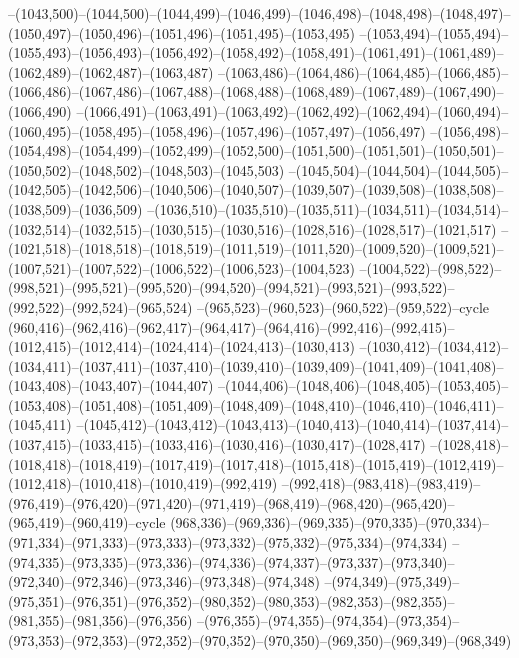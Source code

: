 --(1043,500)--(1044,500)--(1044,499)--(1046,499)--(1046,498)--(1048,498)--(1048,497)--(1050,497)--(1050,496)--(1051,496)--(1051,495)--(1053,495)
--(1053,494)--(1055,494)--(1055,493)--(1056,493)--(1056,492)--(1058,492)--(1058,491)--(1061,491)--(1061,489)--(1062,489)--(1062,487)--(1063,487)
--(1063,486)--(1064,486)--(1064,485)--(1066,485)--(1066,486)--(1067,486)--(1067,488)--(1068,488)--(1068,489)--(1067,489)--(1067,490)--(1066,490)
--(1066,491)--(1063,491)--(1063,492)--(1062,492)--(1062,494)--(1060,494)--(1060,495)--(1058,495)--(1058,496)--(1057,496)--(1057,497)--(1056,497)
--(1056,498)--(1054,498)--(1054,499)--(1052,499)--(1052,500)--(1051,500)--(1051,501)--(1050,501)--(1050,502)--(1048,502)--(1048,503)--(1045,503)
--(1045,504)--(1044,504)--(1044,505)--(1042,505)--(1042,506)--(1040,506)--(1040,507)--(1039,507)--(1039,508)--(1038,508)--(1038,509)--(1036,509)
--(1036,510)--(1035,510)--(1035,511)--(1034,511)--(1034,514)--(1032,514)--(1032,515)--(1030,515)--(1030,516)--(1028,516)--(1028,517)--(1021,517)
--(1021,518)--(1018,518)--(1018,519)--(1011,519)--(1011,520)--(1009,520)--(1009,521)--(1007,521)--(1007,522)--(1006,522)--(1006,523)--(1004,523)
--(1004,522)--(998,522)--(998,521)--(995,521)--(995,520)--(994,520)--(994,521)--(993,521)--(993,522)--(992,522)--(992,524)--(965,524)
--(965,523)--(960,523)--(960,522)--(959,522)--cycle
(960,416)--(962,416)--(962,417)--(964,417)--(964,416)--(992,416)--(992,415)--(1012,415)--(1012,414)--(1024,414)--(1024,413)--(1030,413)
--(1030,412)--(1034,412)--(1034,411)--(1037,411)--(1037,410)--(1039,410)--(1039,409)--(1041,409)--(1041,408)--(1043,408)--(1043,407)--(1044,407)
--(1044,406)--(1048,406)--(1048,405)--(1053,405)--(1053,408)--(1051,408)--(1051,409)--(1048,409)--(1048,410)--(1046,410)--(1046,411)--(1045,411)
--(1045,412)--(1043,412)--(1043,413)--(1040,413)--(1040,414)--(1037,414)--(1037,415)--(1033,415)--(1033,416)--(1030,416)--(1030,417)--(1028,417)
--(1028,418)--(1018,418)--(1018,419)--(1017,419)--(1017,418)--(1015,418)--(1015,419)--(1012,419)--(1012,418)--(1010,418)--(1010,419)--(992,419)
--(992,418)--(983,418)--(983,419)--(976,419)--(976,420)--(971,420)--(971,419)--(968,419)--(968,420)--(965,420)--(965,419)--(960,419)--cycle
(968,336)--(969,336)--(969,335)--(970,335)--(970,334)--(971,334)--(971,333)--(973,333)--(973,332)--(975,332)--(975,334)--(974,334)
--(974,335)--(973,335)--(973,336)--(974,336)--(974,337)--(973,337)--(973,340)--(972,340)--(972,346)--(973,346)--(973,348)--(974,348)
--(974,349)--(975,349)--(975,351)--(976,351)--(976,352)--(980,352)--(980,353)--(982,353)--(982,355)--(981,355)--(981,356)--(976,356)
--(976,355)--(974,355)--(974,354)--(973,354)--(973,353)--(972,353)--(972,352)--(970,352)--(970,350)--(969,350)--(969,349)--(968,349)
